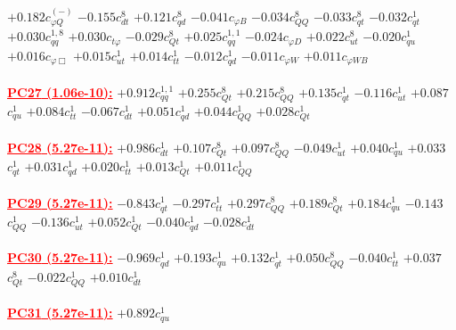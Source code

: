 \documentclass{article}
\begin{document}
{$+0.182$}{\rm $c_{\varphi Q}^{(-)}$}
{$-0.155$}{\rm $c_{dt}^{8}$}
{$+0.121$}{\rm $c_{qd}^{8}$}
{$-0.041$}{\rm $c_{\varphi B}$}
{$-0.034$}{\rm $c_{QQ}^{8}$}
{$-0.033$}{\rm $c_{qt}^{8}$}
{$-0.032$}{\rm $c_{qt}^{1}$}
{$+0.030$}{\rm $c_{qq}^{1,8}$}
{$+0.030$}{\rm $c_{t \varphi}$}
{$-0.029$}{\rm $c_{Qt}^{8}$}
{$+0.025$}{\rm $c_{qq}^{1,1}$}
{$-0.024$}{\rm $c_{\varphi D}$}
{$+0.022$}{\rm $c_{ut}^{8}$}
{$-0.020$}{\rm $c_{qu}^{1}$}
{$+0.016$}{\rm $c_{\varphi \Box}$}
{$+0.015$}{\rm $c_{ut}^{1}$}
{$+0.014$}{\rm $c_{tt}^{1}$}
{$-0.012$}{\rm $c_{qd}^{1}$}
{$-0.011$}{\rm $c_{\varphi W}$}
{$+0.011$}{\rm $c_{\varphi WB}$}
 \nonumber \\ \nonumber \\
\noindent \textcolor{red}{\underline{\bf{PC27} (1.06e-10):}}
{$+0.912$}{\rm $c_{qq}^{1,1}$}
{$+0.255$}{\rm $c_{Qt}^{8}$}
{$+0.215$}{\rm $c_{QQ}^{8}$}
{$+0.135$}{\rm $c_{qt}^{1}$}
{$-0.116$}{\rm $c_{ut}^{1}$}
{$+0.087$}{\rm $c_{qu}^{1}$}
{$+0.084$}{\rm $c_{tt}^{1}$}
{$-0.067$}{\rm $c_{dt}^{1}$}
{$+0.051$}{\rm $c_{qd}^{1}$}
{$+0.044$}{\rm $c_{QQ}^{1}$}
{$+0.028$}{\rm $c_{Qt}^{1}$}
 \nonumber \\ \nonumber \\
\noindent \textcolor{red}{\underline{\bf{PC28} (5.27e-11):}}
{$+0.986$}{\rm $c_{dt}^{1}$}
{$+0.107$}{\rm $c_{Qt}^{8}$}
{$+0.097$}{\rm $c_{QQ}^{8}$}
{$-0.049$}{\rm $c_{ut}^{1}$}
{$+0.040$}{\rm $c_{qu}^{1}$}
{$+0.033$}{\rm $c_{qt}^{1}$}
{$+0.031$}{\rm $c_{qd}^{1}$}
{$+0.020$}{\rm $c_{tt}^{1}$}
{$+0.013$}{\rm $c_{Qt}^{1}$}
{$+0.011$}{\rm $c_{QQ}^{1}$}
 \nonumber \\ \nonumber \\
\noindent \textcolor{red}{\underline{\bf{PC29} (5.27e-11):}}
{$-0.843$}{\rm $c_{qt}^{1}$}
{$-0.297$}{\rm $c_{tt}^{1}$}
{$+0.297$}{\rm $c_{QQ}^{8}$}
{$+0.189$}{\rm $c_{Qt}^{8}$}
{$+0.184$}{\rm $c_{qu}^{1}$}
{$-0.143$}{\rm $c_{QQ}^{1}$}
{$-0.136$}{\rm $c_{ut}^{1}$}
{$+0.052$}{\rm $c_{Qt}^{1}$}
{$-0.040$}{\rm $c_{qd}^{1}$}
{$-0.028$}{\rm $c_{dt}^{1}$}
 \nonumber \\ \nonumber \\
\noindent \textcolor{red}{\underline{\bf{PC30} (5.27e-11):}}
{$-0.969$}{\rm $c_{qd}^{1}$}
{$+0.193$}{\rm $c_{qu}^{1}$}
{$+0.132$}{\rm $c_{qt}^{1}$}
{$+0.050$}{\rm $c_{QQ}^{8}$}
{$-0.040$}{\rm $c_{tt}^{1}$}
{$+0.037$}{\rm $c_{Qt}^{8}$}
{$-0.022$}{\rm $c_{QQ}^{1}$}
{$+0.010$}{\rm $c_{dt}^{1}$}
 \nonumber \\ \nonumber \\
\noindent \textcolor{red}{\underline{\bf{PC31} (5.27e-11):}}
{$+0.892$}{\rm $c_{qu}^{1}$}
\end{document}
